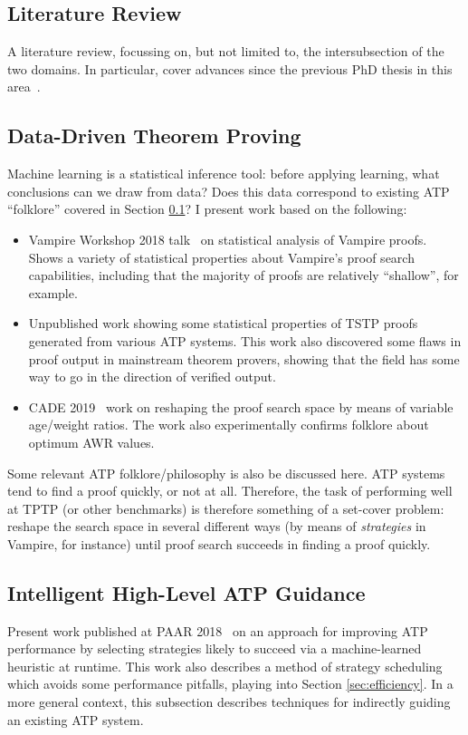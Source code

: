 \documentclass[a4paper]{article}
\begin{document}
\subsection{Literature Review}
\label{sec:lit-review}
A literature review, focussing on, but not limited to, the intersubsection of the two domains.
In particular, cover advances since the previous PhD thesis in this area~\cite{bridge}.

\subsection{Data-Driven Theorem Proving}
\label{sec:data}
Machine learning is a statistical inference tool: before applying learning, what conclusions can we draw from data?
Does this data correspond to existing ATP ``folklore'' covered in Section \ref{sec:lit-review}?
I present work based on the following:
\begin{itemize}
	\item Vampire Workshop 2018 talk~\cite{vampire2018} on statistical analysis of Vampire proofs. Shows a variety of statistical properties about Vampire's proof search capabilities, including that the majority of proofs are relatively ``shallow'', for example.
	\item Unpublished work showing some statistical properties of TSTP proofs generated from various ATP systems. This work also discovered some flaws in proof output in mainstream theorem provers, showing that the field has some way to go in the direction of verified output.
	\item CADE 2019~\cite{cade2019} work on reshaping the proof search space by means of variable age/weight ratios. The work also experimentally confirms folklore about optimum AWR values.
\end{itemize}

\noindent
Some relevant ATP folklore/philosophy is also be discussed here.
ATP systems tend to find a proof quickly, or not at all.
Therefore, the task of performing well at TPTP (or other benchmarks) is therefore something of a set-cover problem: reshape the search space in several different ways (by means of \emph{strategies} in Vampire, for instance) until proof search succeeds in finding a proof quickly.

\subsection{Intelligent High-Level ATP Guidance}
Present work published at PAAR 2018~\cite{paar2018} on an approach for improving ATP performance by selecting strategies likely to succeed via a machine-learned heuristic at runtime.
This work also describes a method of strategy scheduling which avoids some performance pitfalls, playing into Section \ref{sec:efficiency}.
In a more general context, this subsection describes techniques for indirectly guiding an existing ATP system.
\end{document}
